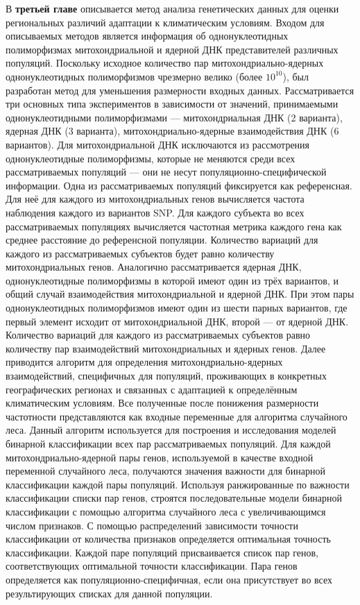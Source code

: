 В \textbf{третьей главе} описывается метод анализа генетических данных для оценки региональных различий адаптации к климатическим условиям. Входом для описываемых методов является информация об однонуклеотидных полиморфизмах митохондриальной и ядерной ДНК представителей различных популяций. Поскольку исходное количество пар митохондриально-ядерных однонуклеотидных полиморфизмов чрезмерно велико (более $10^{10}$), был разработан метод для уменьшения размерности входных данных. Рассматривается три основных типа экспериментов в зависимости от значений, принимаемыми однонуклеотидными полиморфизмами --- митохондриальная ДНК (2 варианта), ядерная ДНК (3 варианта), митохондриально-ядерные взаимодействия ДНК (6 вариантов). Для митохондриальной ДНК исключаются из рассмотрения однонуклеотидные полиморфизмы, которые не меняются среди всех рассматриваемых популяций --- они не несут популяционно-специфической информации. Одна из рассматриваемых популяций фиксируется как референсная. Для неё для каждого из митохондриальных генов вычисляется частота наблюдения каждого из вариантов SNP. Для каждого субъекта во всех рассматриваемых популяциях вычисляется частотная метрика каждого гена как среднее расстояние до референсной популяции. Количество вариаций для каждого из рассматриваемых субъектов будет равно количеству митохондриальных генов. Аналогично рассматривается ядерная ДНК, однонуклеотидные полиморфизмы в которой имеют один из трёх вариантов, и общий случай взаимодействия митохондриальной и ядерной ДНК. При этом пары однонуклеотидных полиморфизмов имеют один из шести парных вариантов, где первый элемент исходит от митохондриальной ДНК, второй --- от ядерной ДНК. Количество вариаций для каждого из рассматриваемых субъектов равно количеству пар взаимодействий митохондриальных и ядерных генов. Далее приводится алгоритм для определения митохондриально-ядерных взаимодействий, специфичных для популяций, проживающих в конкретных географических регионах и связанных с адаптацией к определённым климатическим условиям. Все полученные после понижения размерности частотности представляются как входные переменные для алгоритма случайного леса. Данный алгоритм используется для построения и исследования моделей бинарной классификации всех пар рассматриваемых популяций. Для каждой митохондриально-ядерной пары генов, используемой в качестве входной переменной случайного леса, получаются значения важности для бинарной классификации каждой пары популяций. Используя ранжированные по важности классификации списки пар генов, строятся последовательные модели бинарной классификации с помощью алгоритма случайного леса с увеличивающимся числом признаков. С помощью распределений зависимости точности классификации от количества признаков определяется оптимальная точность классификации. Каждой паре популяций присваивается список пар генов, соответствующих оптимальной точности классификации. Пара генов определяется как популяционно-специфичная, если она присутствует во всех результирующих списках для данной популяции.

